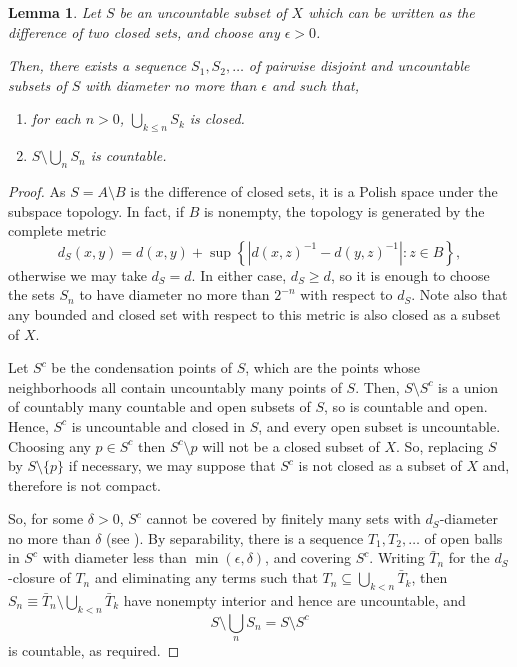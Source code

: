 \documentclass[12pt]{article}
\newtheorem*{lemma*}{Lemma}
\begin{document}
\begin{lemma*}
Let $S$ be an uncountable subset of $X$ which can be written as the difference of two closed sets, and choose any $\epsilon>0$.

Then, there exists a sequence $S_1,S_2,\ldots$ of pairwise disjoint and uncountable subsets of $S$ with diameter no more than $\epsilon$ and such that,
\begin{enumerate}
\item for each $n>0$, $\bigcup_{k\le n}S_k$ is closed.
\item $S\setminus\bigcup_nS_n$ is countable.
\end{enumerate}
\end{lemma*}
\begin{proof}
As $S=A\setminus B$ is the difference of closed sets, it is a Polish space under the subspace topology.
In fact, if $B$ is nonempty, the topology is generated by the complete metric
\begin{equation*}
d_S(x,y)=d(x,y)+\sup\left\{|d(x,z)^{-1}-d(y,z)^{-1}|\colon z\in B\right\},
\end{equation*}
otherwise we may take $d_S=d$. In either case, $d_S\ge d$, so it is enough to choose the sets $S_n$ to have diameter no more than $2^{-n}$ with respect to $d_S$. Note also that any bounded and closed set with respect to this metric is also closed as a subset of $X$.

Let $S^c$ be the condensation points of $S$, which are the points whose neighborhoods all contain uncountably many points of $S$. Then, $S\setminus S^c$ is a union of countably many countable and open subsets of $S$, so is countable and open. Hence, $S^c$ is uncountable and closed in $S$, and every open subset is uncountable.
Choosing any $p\in S^c$ then $S^c\setminus p$ will not be a closed subset of $X$. So, replacing $S$ by $S\setminus\{p\}$ if necessary, we may suppose that $S^c$ is not closed as a subset of $X$ and, therefore is not compact.

So, for some $\delta>0$, $S^c$ cannot be covered by finitely many sets with $d_S$-diameter no more than $\delta$ (see ). By separability, there is a sequence $T_1,T_2,\ldots$ of open balls in $S^c$ with diameter less than $\min(\epsilon,\delta)$, and covering $S^c$. Writing $\bar T_n$ for the $d_S$-closure of $T_n$ and eliminating any terms such that $T_n\subseteq\bigcup_{k<n}\bar T_k$, then $S_n\equiv\bar T_n\setminus \bigcup_{k< n}\bar T_k$ have nonempty interior and hence are uncountable, and
\begin{equation*}
S\setminus\bigcup_nS_n=S\setminus S^c
\end{equation*}
is countable, as required.
\end{proof}
\end{document}
